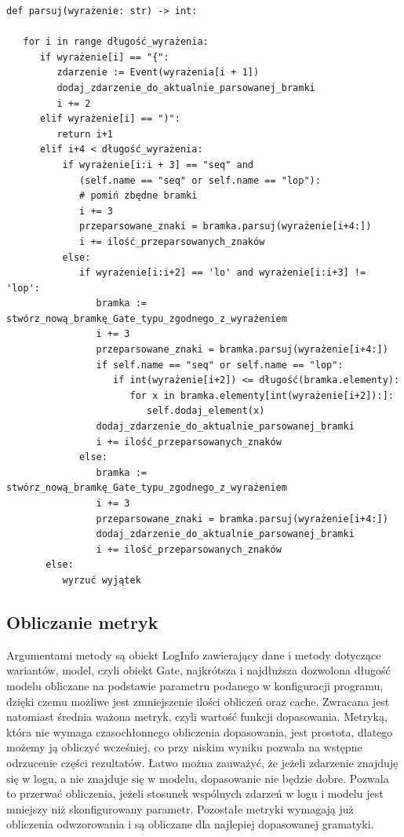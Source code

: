 \lstset{caption=Parser gramatyki, captionpos=b}
\lstset{label=src:passive, frame=single}
\begin{lstlisting}[escapeinside=``]
def parsuj(wyrażenie: str) -> int:

   for i in range długość_wyrażenia:
      if wyrażenie[i] == "{":
         zdarzenie := Event(wyrażenia[i + 1])
         dodaj_zdarzenie_do_aktualnie_parsowanej_bramki 
         i += 2
      elif wyrażenie[i] == ")":
         return i+1
      elif i+4 < długość_wyrażenia:
          if wyrażenie[i:i + 3] == "seq" and 
             (self.name == "seq" or self.name == "lop"):
             # pomiń zbędne bramki
             i += 3
             przeparsowane_znaki = bramka.parsuj(wyrażenie[i+4:])
             i += ilość_przeparsowanych_znaków
          else:
             if wyrażenie[i:i+2] == 'lo' and wyrażenie[i:i+3] != 'lop':  
                bramka := stwórz_nową_bramkę_Gate_typu_zgodnego_z_wyrażeniem 
                i += 3
                przeparsowane_znaki = bramka.parsuj(wyrażenie[i+4:])
                if self.name == "seq" or self.name == "lop":
                   if int(wyrażenie[i+2]) <= długość(bramka.elementy):
                      for x in bramka.elementy[int(wyrażenie[i+2]):]:
                         self.dodaj_element(x)
                dodaj_zdarzenie_do_aktualnie_parsowanej_bramki 
                i += ilość_przeparsowanych_znaków
             else:
                bramka := stwórz_nową_bramkę_Gate_typu_zgodnego_z_wyrażeniem 
                i += 3
                przeparsowane_znaki = bramka.parsuj(wyrażenie[i+4:])
                dodaj_zdarzenie_do_aktualnie_parsowanej_bramki 
                i += ilość_przeparsowanych_znaków
       else:
          wyrzuć wyjątek
\end{lstlisting}

\subsection{Obliczanie metryk}
Argumentami metody są obiekt LogInfo zawierający dane i metody dotyczące wariantów, model, czyli obiekt Gate, najkrótsza i najdłuższa dozwolona długość modelu obliczane na podstawie parametru podanego w konfiguracji programu, dzięki czemu możliwe jest zmniejszenie ilości obliczeń oraz cache. Zwracana jest natomiast średnia ważona metryk, czyli wartość funkcji dopasowania. Metryką, która nie wymaga czasochłonnego obliczenia dopasowania, jest prostota, dlatego możemy ją obliczyć wcześniej, co przy niskim wyniku pozwala na wstępne odrzucenie części rezultatów. Łatwo można zauważyć, że jeżeli zdarzenie znajduję się w logu, a nie znajduje się w modelu, dopasowanie nie będzie dobre. Pozwala to przerwać obliczenia, jeżeli stosunek wspólnych zdarzeń w logu i modelu jest mniejszy niż skonfigurowany parametr. Pozostałe metryki wymagają już obliczenia odwzorowania i są obliczane dla najlepiej dopasowanej gramatyki. 

